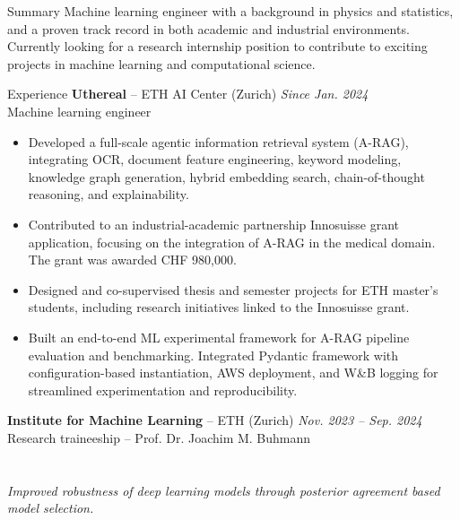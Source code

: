 \documentclass{resume} %
\begin{document}
\setlength{\baselineskip}{-0.2em}

\begin{rSection}{Summary}
    Machine learning engineer with a background in physics and statistics, and a proven track record in 
    both academic and industrial environments.
    Currently looking for a research internship position to contribute to exciting projects in machine learning 
    and computational science.
\end{rSection}



\begin{rSection}{Experience}
    {\bf Uthereal} -- ETH AI Center (Zurich) \hfill {\em Since Jan. 2024} 
    \\ Machine learning engineer \\
    \begin{itemize}
        \item Developed a full-scale agentic information retrieval system (A-RAG), integrating OCR, 
        document feature engineering, keyword modeling, knowledge graph generation, hybrid embedding search,
        chain-of-thought reasoning, and explainability. \
        \item Contributed to an industrial-academic partnership Innosuisse grant application, focusing on 
        the integration of A-RAG in the medical domain. The grant was awarded CHF 980,000.
        \item Designed and co-supervised thesis and semester projects for ETH master's students, including 
        research initiatives linked to the Innosuisse grant.\
        \item Built an end-to-end ML experimental framework for A-RAG pipeline evaluation and benchmarking. 
        Integrated Pydantic framework with configuration-based instantiation, AWS deployment, 
        and W\&B logging for streamlined experimentation and reproducibility. \
    \end{itemize}

    {\bf Institute for Machine Learning} -- ETH (Zurich) \hfill {\em Nov. 2023 -- Sep. 2024} 
    \\ Research traineeship -- Prof. Dr. Joachim M. Buhmann \\ \\
    \\ \textit{Improved robustness of deep learning models through posterior agreement based 
    model selection.}
    

\end{rSection}
\end{document}
